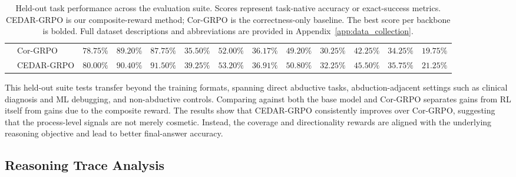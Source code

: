 \documentclass[11pt]{article}
\begin{document}
\begin{table}[t]
{\begin{tabular}{llccccccccccc}
& Cor-GRPO & $78.75\%$ & $89.20\%$ & $87.75\%$ & $35.50\%$ & $52.00\%$ & $36.17\%$ & $49.20\%$ & $30.25\%$ & $42.25\%$ & $34.25\%$ & $19.75\%$ \\
& CEDAR-GRPO & $\mathbf{80.00\%}$ & $\mathbf{90.40\%}$ & $\mathbf{91.50\%}$ & $\mathbf{39.25\%}$ & $\mathbf{53.20\%}$ & $\mathbf{36.91\%}$ & $\mathbf{50.80\%}$ & $\mathbf{32.25\%}$ & $\mathbf{45.50\%}$ & $\mathbf{35.75\%}$ & $\mathbf{21.25\%}$ \\
\bottomrule
\end{tabular}%
}
\caption{Held-out task performance across the evaluation suite. Scores represent task-native accuracy or exact-success metrics. CEDAR-GRPO is our composite-reward method; Cor-GRPO is the correctness-only baseline. The best score per backbone is bolded. Full dataset descriptions and abbreviations are provided in Appendix~\ref{app:data_collection}.}
\label{tab:main_results}
\end{table}


This held-out suite tests transfer beyond the training formats, spanning direct abductive tasks, abduction-adjacent settings such as clinical diagnosis and ML debugging, and non-abductive controls. Comparing against both the base model and Cor-GRPO separates gains from RL itself from gains due to the composite reward. The results show that CEDAR-GRPO consistently improves over Cor-GRPO, suggesting that the process-level signals are not merely cosmetic. Instead, the coverage and directionality rewards are aligned with the underlying reasoning objective and lead to better final-answer accuracy.

\subsection{Reasoning Trace Analysis}
\label{sec:trace_analysis}
\end{document}
